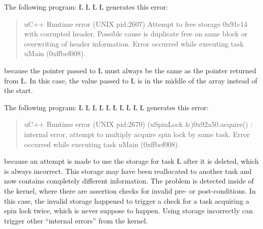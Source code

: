 \documentclass[openright,twoside]{report}
\begin{document}
The following program:
\LGinlinefalse\LGbegin\lgrinde
\L{}
\L{\LB{}}
\L{\LB{}}
\CE{}\L{\LB{\}}}
\endlgrinde\LGend
generates this error:
\begin{quote}
\BGfont
uC++ Runtime error (UNIX pid:2607) Attempt to free storage 0x91c14 with corrupted header.
Possible cause is duplicate free on same block or overwriting of header information.
Error occurred while executing task uMain (0xffbef008).
\end{quote}
because the pointer passed to \LGinlinetrue\LGbegin\lgrinde\L{}\endlgrinde\LGend{} must always be the same as the pointer returned from \LGinlinetrue\LGbegin\lgrinde\L{}\endlgrinde\LGend{}.
In this case, the value passed to \LGinlinetrue\LGbegin\lgrinde\L{}\endlgrinde\LGend{} is in the middle of the array instead of the start.

The following program:
\LGinlinefalse\LGbegin\lgrinde
\L{}
\L{\LB{}}
\L{}
\L{\LB{}}
\L{\LB{\};}}
\L{}
\L{\LB{}}
\L{\LB{}}
\L{\LB{}}
\CE{}\L{\LB{\}}}
\endlgrinde\LGend
generates this error:
\begin{quote}
\BGfont
uC++ Runtime error (UNIX pid:2670) (uSpinLock \&)0x92a50.acquire() : internal error, attempt to multiply acquire spin lock by same task.
Error occurred while executing task uMain (0xffbef008).
\end{quote}
because an attempt is made to use the storage for task \LGinlinetrue\LGbegin\lgrinde\L{}\endlgrinde\LGend{} after it is deleted, which is always incorrect.
This storage may have been reallocated to another task and now contains completely different information.
The problem is detected inside of the \uC kernel, where there are assertion checks for invalid pre- or post-conditions.
In this case, the invalid storage happened to trigger a check for a task acquiring a spin lock twice, which is never suppose to happen.
Using storage incorrectly can trigger other ``internal errors'' from the \uC kernel.
\end{document}
